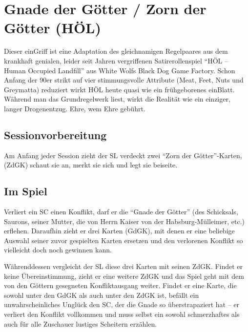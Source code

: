 \section{Gnade der Götter / Zorn der Götter (HÖL)}

Dieser einGriff ist eine Adaptation des gleichnamigen Regelpaares aus dem krankhaft genialen, leider seit Jahren vergriffenen Satirerollenspiel "`HÖL – Human Occupied Landfill"' aus White Wolfs Black Dog Game Factory. Schon Anfang der 90er strikt auf vier stimmungsvolle Attribute (Meat, Feet, Nuts und Greymatta) reduziert wirkt HÖL heute quasi wie ein frühgeborenes einBlatt. Während man das Grundregelwerk liest, wirkt die Realität wie ein einziger, langer Drogenentzug. Ehre, wem Ehre gebührt.

\subsection{Sessionvorbereitung}
Am Anfang jeder Session zieht der SL verdeckt zwei "`Zorn der Götter"'-Karten, (ZdGK) schaut sie an, merkt sie sich und legt sie beiseite.

\subsection{Im Spiel}

Verliert ein SC einen Konflikt, darf er die "`Gnade der Götter"' (des Schicksals, Saurons, seiner Mutter, die von Herrn Kaiser von der Habsburg-Mülleimer, etc.) erflehen. Daraufhin zieht er drei Karten (GdGK), mit denen er eine beliebige Auswahl seiner zuvor gespielten Karten ersetzen und den verlorenen Konflikt so vielleicht doch noch gewinnen kann.

Währenddessen vergleicht der SL diese drei Karten mit seinen ZdGK. Findet er keine Übereinstimmung, zieht er eine weitere ZdGK und das Spiel geht mit dem von den Göttern gesegneten Konfliktausgang weiter. Findet er eine Karte, die sowohl unter den GdGK als auch unter den ZdGK ist, befällt ein unwahrscheinliches Unglück den SC, der die Gnade so überstrapaziert hat -- er verliert den Konflikt vollkommen und muss selbst ein sowohl schmerzhaftes als auch für alle Zuschauer lustiges Scheitern erzählen.

